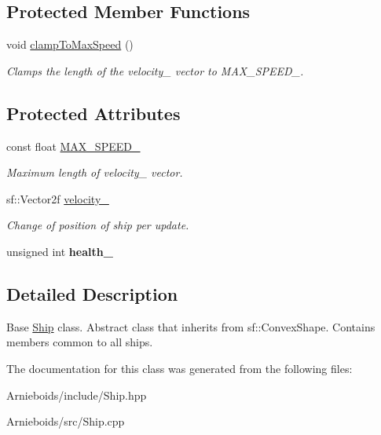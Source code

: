 \subsection*{Protected Member Functions}
\begin{DoxyCompactItemize}
\item 
\hypertarget{class_ship_a8e7bc2ee7d749ab0d28062091733987c}{}void \hyperlink{class_ship_a8e7bc2ee7d749ab0d28062091733987c}{clamp\+To\+Max\+Speed} ()\label{class_ship_a8e7bc2ee7d749ab0d28062091733987c}

\begin{DoxyCompactList}\small\item\em Clamps the length of the velocity\+\_\+ vector to M\+A\+X\+\_\+\+S\+P\+E\+E\+D\+\_\+. \end{DoxyCompactList}\end{DoxyCompactItemize}
\subsection*{Protected Attributes}
\begin{DoxyCompactItemize}
\item 
\hypertarget{class_ship_a6843554ddc3c0098bcc9d17f7a7fbf3b}{}const float \hyperlink{class_ship_a6843554ddc3c0098bcc9d17f7a7fbf3b}{M\+A\+X\+\_\+\+S\+P\+E\+E\+D\+\_\+}\label{class_ship_a6843554ddc3c0098bcc9d17f7a7fbf3b}

\begin{DoxyCompactList}\small\item\em Maximum length of velocity\+\_\+ vector. \end{DoxyCompactList}\item 
\hypertarget{class_ship_ac1584ef024d6ed1538eb2d1e99661557}{}sf\+::\+Vector2f \hyperlink{class_ship_ac1584ef024d6ed1538eb2d1e99661557}{velocity\+\_\+}\label{class_ship_ac1584ef024d6ed1538eb2d1e99661557}

\begin{DoxyCompactList}\small\item\em Change of position of ship per update. \end{DoxyCompactList}\item 
\hypertarget{class_ship_a6a377507ab7c9c91356869121a84c252}{}unsigned int {\bfseries health\+\_\+}\label{class_ship_a6a377507ab7c9c91356869121a84c252}

\end{DoxyCompactItemize}


\subsection{Detailed Description}
Base \hyperlink{class_ship}{Ship} class. Abstract class that inherits from sf\+::\+Convex\+Shape. Contains members common to all ships. 

The documentation for this class was generated from the following files\+:\begin{DoxyCompactItemize}
\item 
Arnieboids/include/Ship.\+hpp\item 
Arnieboids/src/Ship.\+cpp\end{DoxyCompactItemize}
